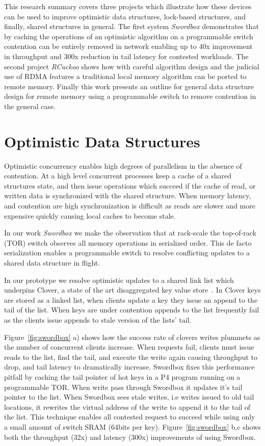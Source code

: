 This research summary covers three projects which illustrate
how these devices can be used to improve optimistic data
structures, lock-based structures, and finally, shared
structures in general.  The first system \textit{Swordbox}
demonstrates that by caching the operations of an optimistic
algorithm on a programmable switch contention can be
entirely removed in network enabling up to 40x improvement
in throughput and 300x reduction in tail latency for
contested workloads. The second project \textit{RCuckoo}
shows how with careful algorithm design and the judicial use
of RDMA features a traditional local memory algorithm can be
ported to remote memory. Finally this work presents an
outline for general data structure design for remote memory
using a programmable switch to remove contention in the
general case.


\section{Optimistic Data Structures}

Optimistic concurrency enables high degrees of parallelism
in the absence of contention. At a high level concurrent
processes keep a cache of a shared structures state, and
then issue operations which succeed if the cache of read, or
written data is synchronized with the shared structure. When
memory latency, and contention are high synchronization is
difficult as reads are slower and more expensive quickly
causing local caches to become stale.

In our work \textit{Swordbox} we make the observation that
at rack-scale the top-of-rack (TOR) switch observes all
memory operations in serialized order. This de facto
serialization enables a programmable switch to resolve
conflicting updates to a shared data structure in flight.

In our prototype we resolve optimistic updates to a shared
link list which underpins Clover, a state of the art
disaggregated key value store~\cite{clover}. In Clover keys
are stored as a linked list, when clients update a key they
issue an append to the tail of the list. When keys are under
contention appends to the list frequently fail as the
clients issue appends to stale version of the lists' tail.

Figure~\ref{fig:swordbox} a) shows how the success rate of
clovers writes plummets as the number of concurrent clients
increase. When requests fail, clients must issue reads to
the list, find the tail, and execute the write again causing
throughput to drop, and tail latency to dramatically
increase. Swordbox fixes this performance pitfall by caching
the tail pointer of hot keys in a P4 program running on a
programmable TOR. When write pass through Swordbox it
updates it's tail pointer to the list.  When Swordbox sees
stale writes, i.e writes issued to old tail locations, it
rewrites the virtual address of the write to append it to
the tail of the list. This technique enables all contested
request to succeed while using only a small amount of switch
SRAM (64bits per key). Figure~\ref{fig:swordbox} b,c shows
both the throughput (32x) and latency (300x) improvements of
using Swordbox.

